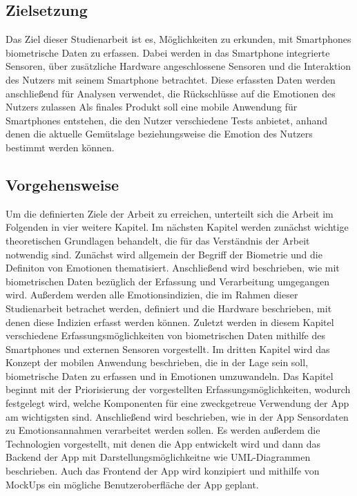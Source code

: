 \subsection{Zielsetzung}
Das Ziel dieser Studienarbeit ist es, Möglichkeiten zu erkunden, mit Smartphones biometrische Daten zu erfassen. Dabei werden in das Smartphone integrierte Sensoren, über zusätzliche Hardware angeschlossene Sensoren und die Interaktion des Nutzers mit seinem Smartphone betrachtet. Diese erfassten Daten werden anschließend für Analysen verwendet, die Rückschlüsse auf die Emotionen des Nutzers zulassen
Als finales Produkt soll eine mobile Anwendung für Smartphones entstehen, die den Nutzer verschiedene Tests anbietet, anhand denen die aktuelle Gemütslage beziehungsweise die Emotion des Nutzers bestimmt werden können.
\subsection{Vorgehensweise}
Um die definierten Ziele der Arbeit zu erreichen, unterteilt sich die Arbeit im Folgenden in vier weitere Kapitel. \newline
Im nächsten Kapitel werden zunächst wichtige theoretischen Grundlagen behandelt, die für das Verständnis der Arbeit notwendig sind. Zunächst wird allgemein der Begriff der Biometrie und die Definiton von Emotionen thematisiert. Anschließend wird beschrieben, wie mit biometrischen Daten bezüglich der Erfassung und Verarbeitung umgegangen wird. Außerdem werden alle Emotionsindizien, die im Rahmen dieser Studienarbeit betrachet werden, definiert und die Hardware beschrieben, mit denen diese Indizien erfasst werden können. Zuletzt werden in diesem Kapitel verschiedene Erfassungsmöglichkeiten von biometrischen Daten mithilfe des Smartphones und externen Sensoren vorgestellt. \newline
Im dritten Kapitel wird das Konzept der mobilen Anwendung beschrieben, die in der Lage sein soll, biometrische Daten zu erfassen und in Emotionen umzuwandeln. Das Kapitel beginnt mit der Priorisierung der vorgestellten Erfassungsmöglichkeiten, wodurch festgelegt wird, welche Komponenten für eine zweckgetreue Verwendung der App am wichtigsten sind. Anschließend wird beschrieben, wie in der App Sensordaten zu Emotionsannahmen verarbeitet werden sollen. Es werden außerdem die Technologien vorgestellt, mit denen die App entwickelt wird und dann das Backend der App mit Darstellungsmöglichkeitne wie UML-Diagrammen beschrieben. Auch das Frontend der App wird konzipiert und mithilfe von MockUps ein mögliche Benutzeroberfläche der App geplant. \newline
